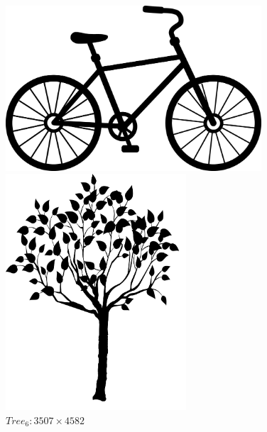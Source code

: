 \documentclass[11pt,a4paper]{article}
\begin{document}
            \begin{figure}[ht]
                \centering
                \begin{minipage}[t]{.5\textwidth}
                    \centering
                    \includegraphics[width=0.85\textwidth]{figs/bicycle_binary.png}
                    \caption{$Bicycle: 6409 \times 4139$}
                    \label{fig:bicycle_binary}
                \end{minipage}%
                \begin{minipage}[t]{.5\textwidth}
                    \centering
                    \includegraphics[width=0.6\textwidth]{figs/tree_6_binary.png}
                    \caption{$Tree_{6}: 3507 \times 4582$}
                    \label{fig:tree_6_binary}
                \end{minipage}
            \end{figure}
\end{document}

